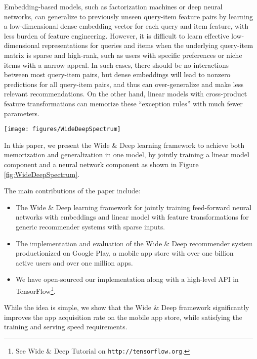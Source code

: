 \documentclass{sig-alternate-05-2015}
\begin{document}
Embedding-based models, such as factorization machines \cite{LibFMTIST12} or deep neural networks, can generalize to previously unseen query-item feature pairs by learning a low-dimensional dense embedding vector for each query and item feature, with less burden of feature engineering. However, it is difficult to learn effective low-dimensional representations for queries and items when the underlying query-item matrix is sparse and high-rank, such as users with specific preferences or niche items with a narrow appeal. In such cases, there should be no interactions between most query-item pairs, but dense embeddings will lead to nonzero predictions for all query-item pairs, and thus can over-generalize and make less relevant recommendations. On the other hand, linear models with cross-product feature transformations can memorize these ``exception rules'' with much fewer parameters.

\begin{figure*}[t!]
	\centering
	\texttt{[image: figures/WideDeepSpectrum]}
	\caption{The spectrum of Wide \& Deep models.}
	\label{fig:WideDeepSpectrum}
\end{figure*}

In this paper, we present the Wide \& Deep learning framework to achieve both memorization and generalization in one model, by jointly training a linear model component and a neural network component as shown in Figure \ref{fig:WideDeepSpectrum}.

The main contributions of the paper include:
\begin{itemize}
\item The Wide \& Deep learning framework for jointly training feed-forward neural networks with embeddings and linear model with feature transformations for generic recommender systems with sparse inputs.
\item The implementation and evaluation of the Wide \& Deep recommender system productionized on Google Play, a mobile app store with over one billion active users and over one million apps.
\item We have open-sourced our implementation along with a high-level API in TensorFlow\footnote{See Wide \& Deep Tutorial on \texttt{http://tensorflow.org}.}.
\end{itemize}

While the idea is simple, we show that the Wide \& Deep framework significantly improves the app acquisition rate on the mobile app store, while satisfying the training and serving speed requirements.
\end{document}
